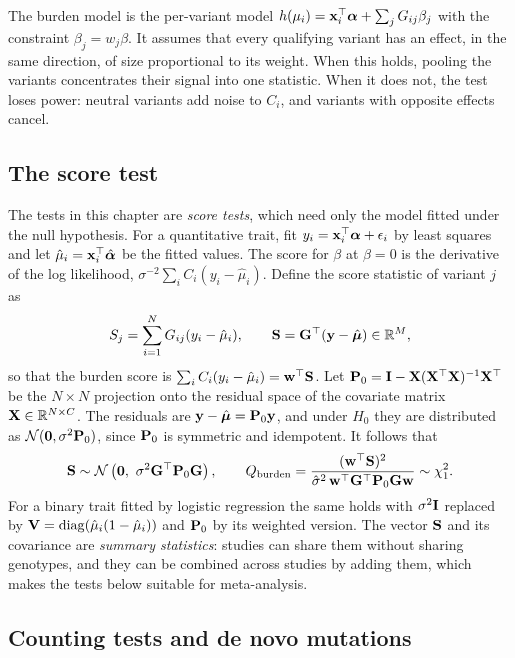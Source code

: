 The burden model is the per-variant model $h(\mu_i)=\mathbf{x}_i^\top\boldsymbol{\alpha}+\sum_j G_{ij}\beta_j$ with the constraint $\beta_j=w_j\beta$. It assumes that every qualifying variant has an effect, in the same direction, of size proportional to its weight. When this holds, pooling the variants concentrates their signal into one statistic. When it does not, the test loses power: neutral variants add noise to $C_i$, and variants with opposite effects cancel.

\subsection{The score test}

The tests in this chapter are \emph{score tests}, which need only the model fitted under the null hypothesis. For a quantitative trait, fit $y_i=\mathbf{x}_i^\top\boldsymbol{\alpha}+\epsilon_i$ by least squares and let $\hat\mu_i=\mathbf{x}_i^\top\hat{\boldsymbol{\alpha}}$ be the fitted values. The score for $\beta$ at $\beta=0$ is the derivative of the log likelihood, $\sigma^{-2}\sum_i C_i(y_i-\hat\mu_i)$. Define the score statistic of variant $j$ as
\begin{equation}
  S_j = \sum_{i=1}^N G_{ij}(y_i-\hat\mu_i), \qquad \mathbf{S} = \mathbf{G}^\top(\mathbf{y}-\hat{\boldsymbol{\mu}})\in\mathbb{R}^M ,
  \label{eq:score}
\end{equation}
so that the burden score is $\sum_i C_i(y_i-\hat\mu_i)=\mathbf{w}^\top\mathbf{S}$. Let $\mathbf{P}_0=\mathbf{I}-\mathbf{X}(\mathbf{X}^\top\mathbf{X})^{-1}\mathbf{X}^\top$ be the $N\times N$ projection onto the residual space of the covariate matrix $\mathbf{X}\in\mathbb{R}^{N\times C}$. The residuals are $\mathbf{y}-\hat{\boldsymbol{\mu}}=\mathbf{P}_0\mathbf{y}$, and under $H_0$ they are distributed as $\mathcal{N}(\mathbf{0},\sigma^2\mathbf{P}_0)$, since $\mathbf{P}_0$ is symmetric and idempotent. It follows that
\begin{equation}
  \vS\sim\Normal\left(\mathbf{0},\ \sigma^2\mG^\top\mP_0\mG\right), \qquad
  Q_{\text{burden}} = \frac{(\vw^\top\vS)^2}{\hat\sigma^2\,\vw^\top\mG^\top\mP_0\mG\vw} \sim \chi^2_1 .
\end{equation}
For a binary trait fitted by logistic regression the same holds with $\sigma^2\mathbf{I}$ replaced by $\mathbf{V}=\operatorname{diag}(\hat\mu_i(1-\hat\mu_i))$ and $\mathbf{P}_0$ by its weighted version. The vector $\mathbf{S}$ and its covariance are \emph{summary statistics}: studies can share them without sharing genotypes, and they can be combined across studies by adding them, which makes the tests below suitable for meta-analysis.

\subsection{Counting tests and de novo mutations}

